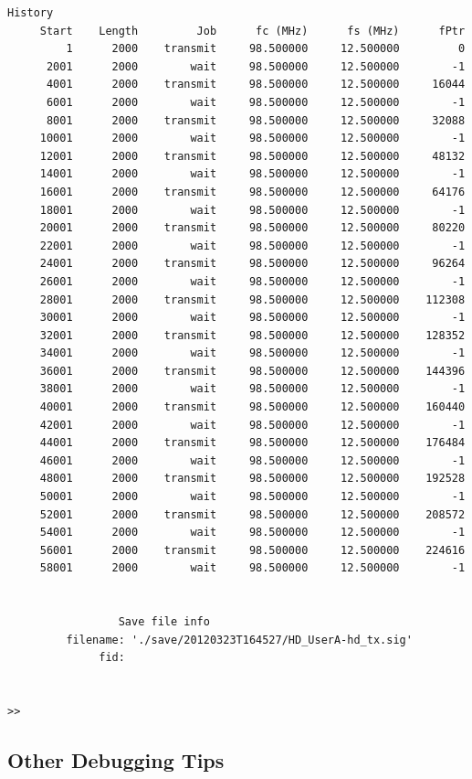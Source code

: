 \begin{lstlisting}[numbers=none]
                 History
     Start    Length         Job      fc (MHz)      fs (MHz)      fPtr
         1      2000    transmit     98.500000     12.500000         0
      2001      2000        wait     98.500000     12.500000        -1
      4001      2000    transmit     98.500000     12.500000     16044
      6001      2000        wait     98.500000     12.500000        -1
      8001      2000    transmit     98.500000     12.500000     32088
     10001      2000        wait     98.500000     12.500000        -1
     12001      2000    transmit     98.500000     12.500000     48132
     14001      2000        wait     98.500000     12.500000        -1
     16001      2000    transmit     98.500000     12.500000     64176
     18001      2000        wait     98.500000     12.500000        -1
     20001      2000    transmit     98.500000     12.500000     80220
     22001      2000        wait     98.500000     12.500000        -1
     24001      2000    transmit     98.500000     12.500000     96264
     26001      2000        wait     98.500000     12.500000        -1
     28001      2000    transmit     98.500000     12.500000    112308
     30001      2000        wait     98.500000     12.500000        -1
     32001      2000    transmit     98.500000     12.500000    128352
     34001      2000        wait     98.500000     12.500000        -1
     36001      2000    transmit     98.500000     12.500000    144396
     38001      2000        wait     98.500000     12.500000        -1
     40001      2000    transmit     98.500000     12.500000    160440
     42001      2000        wait     98.500000     12.500000        -1
     44001      2000    transmit     98.500000     12.500000    176484
     46001      2000        wait     98.500000     12.500000        -1
     48001      2000    transmit     98.500000     12.500000    192528
     50001      2000        wait     98.500000     12.500000        -1
     52001      2000    transmit     98.500000     12.500000    208572
     54001      2000        wait     98.500000     12.500000        -1
     56001      2000    transmit     98.500000     12.500000    224616
     58001      2000        wait     98.500000     12.500000        -1


                 Save file info
         filename: './save/20120323T164527/HD_UserA-hd_tx.sig'
              fid:


>>
\end{lstlisting}


\subsection{Other Debugging Tips}

